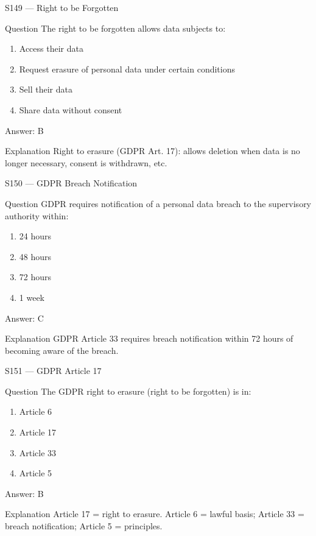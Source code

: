 \documentclass[aspectratio=169,8pt]{beamer}
\begin{document}
	\begin{frame}{S149 --- Right to be Forgotten}
		\begin{block}{Question}
			The right to be forgotten allows data subjects to:
			\begin{enumerate}
				\item Access their data
				\item Request erasure of personal data under certain conditions
				\item Sell their data
				\item Share data without consent
			\end{enumerate}
		\end{block}
		\begin{exampleblock}{Answer: B}\end{exampleblock}
		\begin{block}{Explanation}
			Right to erasure (GDPR Art. 17): allows deletion when data is no longer necessary, consent is withdrawn, etc.
		\end{block}
	\end{frame}
	
	\begin{frame}{S150 --- GDPR Breach Notification}
		\begin{block}{Question}
			GDPR requires notification of a personal data breach to the supervisory authority within:
			\begin{enumerate}
				\item 24 hours
				\item 48 hours
				\item 72 hours
				\item 1 week
			\end{enumerate}
		\end{block}
		\begin{exampleblock}{Answer: C}\end{exampleblock}
		\begin{block}{Explanation}
			GDPR Article 33 requires breach notification within 72 hours of becoming aware of the breach.
		\end{block}
	\end{frame}
	
	\begin{frame}{S151 --- GDPR Article 17}
		\begin{block}{Question}
			The GDPR right to erasure (right to be forgotten) is in:
			\begin{enumerate}
				\item Article 6
				\item Article 17
				\item Article 33
				\item Article 5
			\end{enumerate}
		\end{block}
		\begin{exampleblock}{Answer: B}\end{exampleblock}
		\begin{block}{Explanation}
			Article 17 = right to erasure. Article 6 = lawful basis; Article 33 = breach notification; Article 5 = principles.
		\end{block}
	\end{frame}
	
\end{document}
